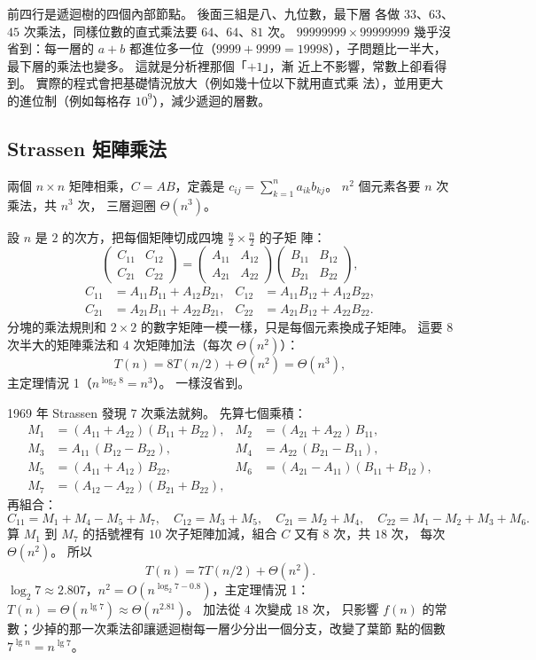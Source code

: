 前四行是遞迴樹的四個內部節點。 後面三組是八、九位數，最下層
各做 $33$、$63$、$45$ 次乘法，同樣位數的直式乘法要 $64$、$64$、$81$ 次。
$99999999 \times 99999999$ 幾乎沒省到：每一層的 $a + b$ 都進位多一位（$9999 +
9999 = 19998$），子問題比一半大，最下層的乘法也變多。 這就是分析裡那個「$+1$」，漸
近上不影響，常數上卻看得到。 實際的程式會把基礎情況放大（例如幾十位以下就用直式乘
法），並用更大的進位制（例如每格存 $10^9$），減少遞迴的層數。


\subsection{Strassen 矩陣乘法}
\label{sec:dc-strassen}

兩個 $n \times n$ 矩陣相乘，$C = AB$，定義是
$c_{ij} = \sum_{k=1}^{n} a_{ik} b_{kj}$。 $n^2$ 個元素各要 $n$ 次乘法，共 $n^3$ 次，
三層迴圈 $\Theta(n^3)$。

設 $n$ 是 $2$ 的次方，把每個矩陣切成四塊 $\frac{n}{2} \times \frac{n}{2}$ 的子矩
陣：
\[
\begin{pmatrix} C_{11} & C_{12} \\ C_{21} & C_{22} \end{pmatrix}
= \begin{pmatrix} A_{11} & A_{12} \\ A_{21} & A_{22} \end{pmatrix}
\begin{pmatrix} B_{11} & B_{12} \\ B_{21} & B_{22} \end{pmatrix},
\]
\[
\begin{aligned}
C_{11} &= A_{11} B_{11} + A_{12} B_{21}, & C_{12} &= A_{11} B_{12} + A_{12} B_{22}, \\
C_{21} &= A_{21} B_{11} + A_{22} B_{21}, & C_{22} &= A_{21} B_{12} + A_{22} B_{22}.
\end{aligned}
\]
分塊的乘法規則和 $2 \times 2$ 的數字矩陣一模一樣，只是每個元素換成子矩陣。 這要 $8$
次半大的矩陣乘法和 $4$ 次矩陣加法（每次 $\Theta(n^2)$）：
\[
T(n) = 8T(n/2) + \Theta(n^2) = \Theta(n^3),
\]
主定理情況 1（$n^{\log_2 8} = n^3$）。 一樣沒省到。

1969 年 Strassen 發現 $7$ 次乘法就夠。 先算七個乘積：
\[
\begin{aligned}
M_1 &= (A_{11} + A_{22})(B_{11} + B_{22}), &
M_2 &= (A_{21} + A_{22})\,B_{11}, \\
M_3 &= A_{11}\,(B_{12} - B_{22}), &
M_4 &= A_{22}\,(B_{21} - B_{11}), \\
M_5 &= (A_{11} + A_{12})\,B_{22}, &
M_6 &= (A_{21} - A_{11})(B_{11} + B_{12}), \\
M_7 &= (A_{12} - A_{22})(B_{21} + B_{22}),
\end{aligned}
\]
再組合：
\[
C_{11} = M_1 + M_4 - M_5 + M_7, \quad
C_{12} = M_3 + M_5, \quad
C_{21} = M_2 + M_4, \quad
C_{22} = M_1 - M_2 + M_3 + M_6 .
\]
算 $M_1$ 到 $M_7$ 的括號裡有 $10$ 次子矩陣加減，組合 $C$ 又有 $8$ 次，共 $18$ 次，
每次 $\Theta(n^2)$。 所以
\[
T(n) = 7T(n/2) + \Theta(n^2).
\]
$\log_2 7 \approx 2.807$，$n^2 = O(n^{\log_2 7 - 0.8})$，主定理情況 1：
$T(n) = \Theta(n^{\lg 7}) \approx \Theta(n^{2.81})$。 加法從 $4$ 次變成 $18$ 次，
只影響 $f(n)$ 的常數；少掉的那一次乘法卻讓遞迴樹每一層少分出一個分支，改變了葉節
點的個數 $7^{\lg n} = n^{\lg 7}$。

